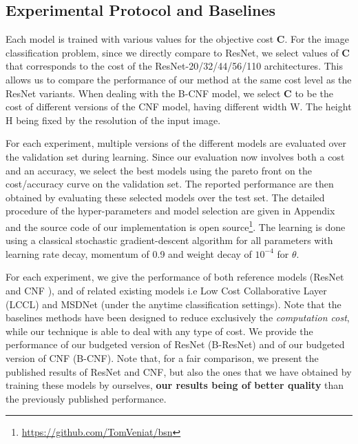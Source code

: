 \documentclass[10pt,twocolumn,letterpaper]{article}
\begin{document}
\subsection{Experimental Protocol and Baselines}


Each model is trained with various values for the objective cost $\mathbf{C}$. For the image classification problem, since we directly compare to ResNet, we select values of $\mathbf{C}$ that corresponds to the cost of the ResNet-20/32/44/56/110 architectures. This allows us to compare the performance of our method at the same cost level as the ResNet variants. When dealing with the B-CNF model, we select $\mathbf{C}$ to be the cost of different versions of the CNF model, having different width W. The height H being fixed by the resolution of the input image.

For each experiment, multiple versions of the different models are evaluated over the validation set during learning. Since our evaluation now involves both a cost and an accuracy, we select the best models using the pareto front on the cost/accuracy curve on the validation set. The reported performance are then obtained by evaluating these selected models over the test set. The detailed procedure of the hyper-parameters and model selection are given in Appendix and the source code of our implementation is open source\footnote{\url{https://github.com/TomVeniat/bsn}}. The learning is done using a classical stochastic gradient-descent algorithm for all parameters with learning rate decay, momentum of 0.9 and weight decay of $10^{-4}$ for $\theta$. 




For each experiment, we give the performance of both reference models (ResNet \cite{DBLP:journals/corr/HeZRS15} and CNF \cite{DBLP:journals/corr/SaxenaV16}), and of related existing models
i.e Low Cost Collaborative Layer (LCCL)\cite{DBLP:journals/corr/DongHYY17} and MSDNet \cite{DBLP:journals/corr/HuangCLWMW17} (under the anytime classification settings). Note that the baselines methods have been designed to reduce exclusively the \textit{computation cost}, while our technique is able to deal with any type of cost. We provide the performance of our budgeted version of ResNet (B-ResNet) and of our budgeted version of CNF (B-CNF). Note that, for a fair comparison, we present the published results of ResNet and CNF, but also the ones that we have obtained by training these models by ourselves, \textbf{our results being of better quality} than the previously published performance.
\end{document}
